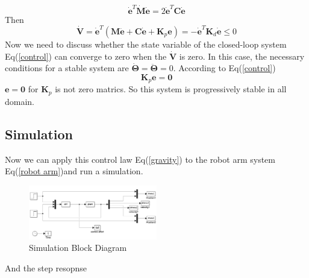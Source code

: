 \documentclass[a4paper]{article}
\begin{document}
\begin{equation}
\boldsymbol{\dot e}^T\boldsymbol{\dot M}\boldsymbol{\dot e}  = 2\boldsymbol{\dot e}^T\boldsymbol{C}\boldsymbol{\dot e} 
\end{equation} 
Then
\begin{equation}
\boldsymbol{\dot V}  = \boldsymbol{\dot e}^T(\boldsymbol{M}\boldsymbol{\ddot e} + \boldsymbol{C}\boldsymbol{\dot e} + \boldsymbol{K}_p\boldsymbol{e}) = -\boldsymbol{\dot e}^T\boldsymbol{K}_d\boldsymbol{\dot e} \leq 0
\end{equation}
Now we need to discuss whether the state variable of the closed-loop system Eq(\ref{control}) can converge to zero when the $\boldsymbol{\dot V}$ is zero. In this case, the necessary conditions for a stable system are $\boldsymbol{\dot \Theta} = \boldsymbol{\ddot \Theta}  = 0$. According to Eq(\ref{control})
\begin{equation}
\boldsymbol{K}_p \boldsymbol{e} = \boldsymbol{0} 
\end{equation}
$\boldsymbol{e} = \boldsymbol{0}$ for $\boldsymbol{K}_p$ is not zero matrics. So this system is progressively stable in all domain. 

\subsection{Simulation}
Now we can apply this control law Eq(\ref{gravity}) to the robot arm system Eq(\ref{robot arm})and run a simulation. 
\begin{figure}[H]
\centering
\includegraphics[width = 0.5\textwidth]{pic/sim.png}
\caption{Simulation Block Diagram}
\end{figure}
And the step resopnse 
\end{document}
